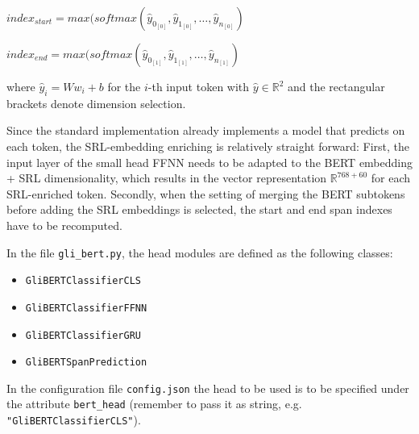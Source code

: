 $index_{start} = max(softmax(\hat{y}_{0_[0]}, \hat{y}_{1_[0]}, \dotso , \hat{y}_{n_[0]})$

$index_{end} = max(softmax(\hat{y}_{0_[1]}, \hat{y}_{1_[1]}, \dotso , \hat{y}_{n_[1]})$

where $\hat{y}_i = Ww_i+b$ for the $i$-th input token with $\hat{y} \in \mathbb{R}^2$ and
the rectangular brackets denote dimension selection.

Since the standard implementation already implements a model that predicts on each token,
the SRL-embedding enriching is relatively straight forward:
First, the input layer of the small head FFNN needs to be adapted to the BERT embedding + SRL
dimensionality, which results in the vector representation $\mathbb{R}^{768+60}$ for each
SRL-enriched token. Secondly, when the setting of merging the BERT subtokens before adding
the SRL embeddings is selected, the start and end span indexes have to be recomputed.


\begin{tcolorbox}[
  colback=blue!5!white,
  colframe=blue!75!black,
  title={\centering Code}]

  In the file \texttt{gli\_bert.py}, the head modules are defined as the following classes:

  \begin{itemize}
    \itemsep0em
    \item[] \texttt{GliBERTClassifierCLS}
    \item[] \texttt{GliBERTClassifierFFNN}
    \item[] \texttt{GliBERTClassifierGRU}
    \item[] \texttt{GliBERTSpanPrediction}
  \end{itemize}

  In the configuration file \texttt{config.json} the head to be used is to be
  specified under the attribute \texttt{bert\_head} (remember to pass it as string, e.g. \texttt{"GliBERTClassifierCLS"}).
\end{tcolorbox}



